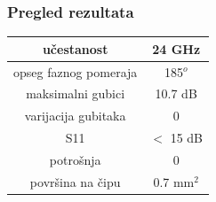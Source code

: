 \documentclass{beamer}
\begin{document}
\begin{frame}
\frametitle{Pregled rezultata}
  \begin{center}
    \begin{tabular}{ | c | c | }
      \hline
      učestanost & 24 GHz \\
      \hline 
      opseg faznog pomeraja & 185$^o$ \\  
      \hline
      maksimalni gubici & 10.7 dB \\
      \hline
      varijacija gubitaka & 0 \\
      \hline
      S11 & $<$ 15 dB \\
      \hline
      potrošnja & 0 \\
      \hline
      površina na čipu & 0.7 mm$^2$  \\  
      \hline
    \end{tabular}
  \end{center}
\end{frame}








\end{document}
